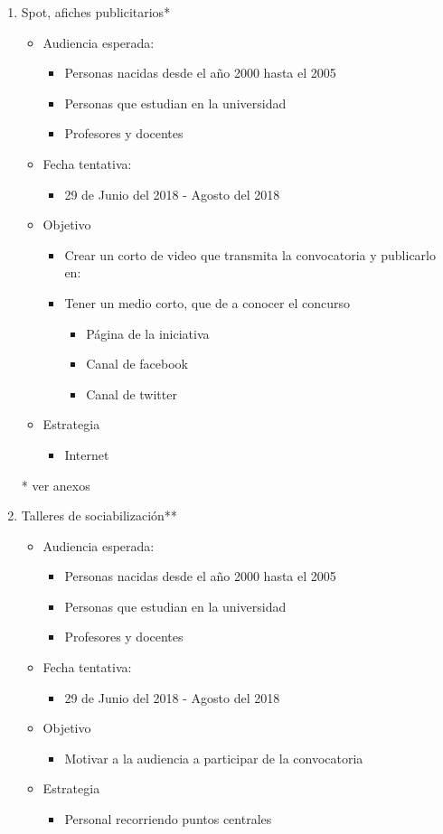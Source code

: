 \documentclass{article}
\begin{document}
\begin{enumerate}
\item Spot, afiches publicitarios* 
\begin{itemize}
\item Audiencia esperada:
\begin{itemize}
\item Personas nacidas desde el año 2000 hasta el 2005
\item Personas que estudian en la universidad
\item Profesores y docentes
\end{itemize}
\item Fecha tentativa:
\begin{itemize}
\item 29 de Junio del 2018 - Agosto del 2018
\end{itemize}
\item Objetivo
\begin{itemize}
\item Crear un corto de video que transmita la convocatoria y publicarlo en:
\item Tener un medio corto, que de a conocer el concurso
\begin{itemize}
\item Página de la iniciativa 
\item Canal de facebook
\item Canal de twitter
\end{itemize}
\end{itemize}
\item Estrategia
\begin{itemize}
\item Internet
\end{itemize}
\end{itemize}
* ver anexos

\item Talleres de sociabilización** 
\begin{itemize}
\item Audiencia esperada:
\begin{itemize}
\item Personas nacidas desde el año 2000 hasta el 2005
\item Personas que estudian en la universidad
\item Profesores y docentes
\end{itemize}
\item Fecha tentativa:
\begin{itemize}
\item 29 de Junio del 2018 - Agosto del 2018
\end{itemize}
\item Objetivo
\begin{itemize}
\item Motivar a la audiencia a participar de la convocatoria
\end{itemize}
\item Estrategia
\begin{itemize}
\item Personal recorriendo puntos centrales
\end{itemize}
\end{itemize}


\end{enumerate}
\end{document}
